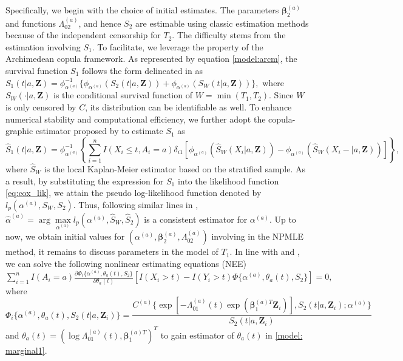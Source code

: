 \documentclass[APA,Times1COL]{WileyNJDv5} %
\theoremstyle{plain}
\def\bfZ{\mathbf{Z}}
\def\tildeZ{\widetilde{\bfZ}}
\def\bfbeta{\bm{\beta}}
\def\hatalpha{\widehat{\alpha}}
\begin{document}
\iffalse
Specifically, we begin with the choice of initial estimates. The parameters $\bfbeta_2^{(a)}$ and functions $\Lambda_{02}^{(a)}$, and hence $S_2$ are estimable using classic estimation methods because of the independent censorship for $T_2$. The difficulty stems from the estimation involving $S_1$. To facilitate, we 
leverage the property of the Archimedean copula framework. As represented by equation \eqref{model:arcm}, 
the survival function $S_1$ follows the form delineated in \cite{fine2001semi} as
$S_1(t|a,\bfZ) = \phi_{\alpha^{(a)}}^{-1}\{\phi_{\alpha^{(a)}}(S_2(t|a,\bfZ) )+\phi_{\alpha^{(a)}}(S_W(t|a,\bfZ) )\},$ 
where $S_W(\cdot|a,\bfZ)$ is the conditional survival function of $W = \min(T_1,T_2)$. Since $W$ is only censored by $C$, its distribution can be identifiable as well. 
To enhance numerical stability and computational efficiency, we further adopt the copula-graphic estimator proposed by \cite{lakhal2008} to  estimate $S_1$ as
\begin{equation*}
\widehat{S}_1 (t|a,\bfZ) = \phi_{\alpha^{(a)}}^{-1}\left\{\sum\limits_{i=1}^n I(X_i\leq t, A_i=a)\delta_{i1}\left[\phi_{\alpha^{(a)}}(\widehat{S}_W(X_i|a,\bfZ) )-\phi_{\alpha^{(a)}}(\widehat{S}_W(X_i-|a,\bfZ) )\right]\right\},
   \label{eq:S1est_CG}
\end{equation*}
where $\widehat{S}_W$ is the local Kaplan-Meier estimator based on the stratified sample. As a result, by substituting the expression for $S_1$ into the likelihood function \eqref{eq:cox_lik}, we attain the pseudo log-likelihood function denoted by $l_p(\alpha^{(a)},S_W,S_2)$. Thus, following similar lines in \cite{zhu2022nee}, $\hatalpha^{(a)} = \arg\max\limits_ {\alpha^{(a)}}l_p(\alpha^{(a)},\widehat{S}_W,\widehat{S}_2)$ is a consistent estimator for $\alpha^{(a)}$. Up to now, we obtain initial values for $(\alpha^{(a)},\bfbeta_2^{(a)},\Lambda_{02}^{(a)})$ involving in the NPMLE method, it remains to discuss parameters in the model of $T_1$. In line with \cite{peng2007semicompeting} and \cite{zhu2022nee}, we can solve the following nonlinear estimating equations (NEE)  
$\sum\limits_{i=1}^n I(A_i=a)
\frac{\partial\Phi_i\{\alpha^{(a)},\theta_a(t),S_2\}}{\partial \theta_a(t)}\left [ I(X_i>t) - I(Y_i>t) \Phi\{\alpha^{(a)},\theta_a(t),S_2\}\right] = 0,$
where
\begin{equation*} 
\Phi_i\{\alpha^{(a)},\theta_a(t),S_2(t|a,\bfZ_i)\}= \frac{ C^{(a)}\{\exp[-\Lambda_{01}^{(a)}(t)\exp(\bfbeta_{1}^{(a)T}\bfZ_i)],S_2(t|a,\bfZ_i);\alpha^{(a)}\}}{S_2(t|a,\bfZ_i)}
\end{equation*}
and $\theta_a(t)  =(\log\Lambda_{01}^{(a)}(t), \bfbeta_{1}^{(a)T})^T$
to gain estimator of $\theta_a(t)$ in \eqref{model: marginal1}. 
\end{document}

